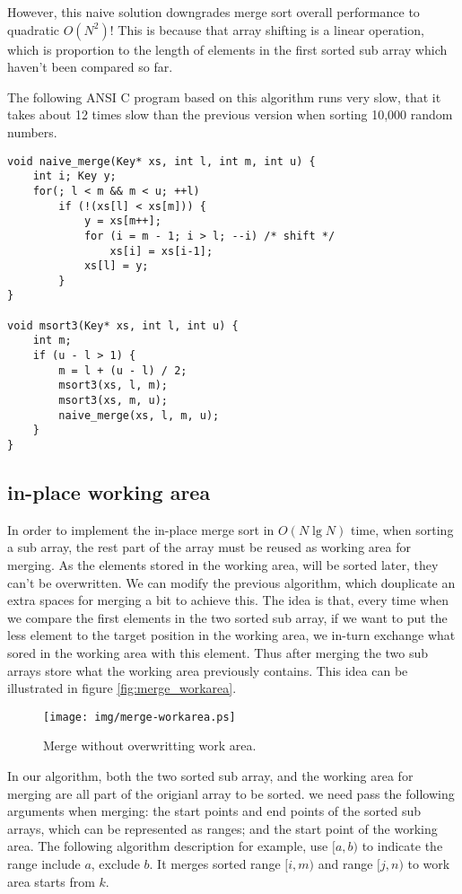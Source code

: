 \documentclass{article}
\begin{document}
However, this naive solution downgrades merge sort overall performance to quadratic $O(N^2)$! This is because
that array shifting is a linear operation, which is proportion to the length of elements in 
the first sorted sub array which haven't been compared so far. 

The following ANSI C program based on this algorithm runs very slow, that it takes about 12 times slow than
the previous version when sorting 10,000 random numbers.

\lstset{language=C}
\begin{lstlisting}
void naive_merge(Key* xs, int l, int m, int u) {
    int i; Key y;
    for(; l < m && m < u; ++l)
        if (!(xs[l] < xs[m])) {
            y = xs[m++];
            for (i = m - 1; i > l; --i) /* shift */
                xs[i] = xs[i-1];
            xs[l] = y;
        }
}

void msort3(Key* xs, int l, int u) {
    int m;
    if (u - l > 1) {
        m = l + (u - l) / 2;
        msort3(xs, l, m);
        msort3(xs, m, u);
        naive_merge(xs, l, m, u);
    }
}  
\end{lstlisting}

\subsection{in-place working area}

In order to implement the in-place merge sort in $O(N \lg N)$ time, when sorting a sub array, the rest part of 
the array must be reused as working area for merging. As the elements stored in the working area, will be sorted
later, they can't be overwritten. We can modify the previous algorithm, which douplicate an extra spaces for merging
a bit to achieve this. The idea is that, every time when we compare the first elements in the two sorted sub
array, if we want to put the less element to the target position in the working area, we in-turn exchange what
sored in the working area with this element. Thus after merging the two sub arrays store what the working area
previously contains. This idea can be illustrated in figure \ref{fig:merge_workarea}.

\begin{figure}[htbp]
 \centering
 \texttt{[image: img/merge-workarea.ps]}
 \caption{Merge without overwritting work area.}
 \label{fig:merge-workarea}
\end{figure}

In our algorithm, both the two sorted sub array, and the working area for merging are all part of the 
origianl array to be sorted. we need pass the following arguments when merging: the start points and end
points of the sorted sub arrays, which can be represented as ranges; and the start point of the working
area. The following algorithm description for example, use $[a, b)$ to indicate the range include $a$, 
exclude $b$. It merges sorted range $[i, m)$ and range $[j, n)$ to work area starts from $k$.
\end{document}
